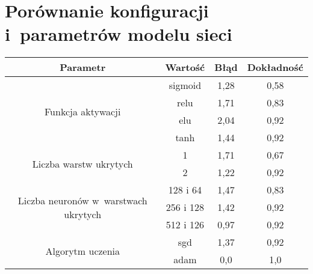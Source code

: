 \chapter{Porównanie konfiguracji i~parametrów modelu sieci}
\label{ch:nn_comparison_table}

\begin{table}[h]
\centering
\begin{tabular}{c|c|c|c}
\toprule
Parametr                                              & Wartość   & Błąd & Dokładność \\
\midrule
\multirow{4}{*}{Funkcja aktywacji}                    & sigmoid   & 1,28 & 0,58       \\
                                                      & relu      & 1,71 & 0,83       \\
                                                      & elu       & 2,04 & 0,92       \\
                                                      & tanh      & 1,44 & 0,92       \\
\midrule
\multirow{2}{*}{Liczba warstw ukrytych}               & 1         & 1,71 & 0,67       \\
                                                      & 2         & 1,22 & 0,92       \\
\midrule                                                     
\multirow{3}{*}{\parbox{5cm}
{\centering Liczba neuronów w~warstwach ukrytych}}     & 128 i 64  & 1,47 & 0,83       \\
                                                      & 256 i 128 & 1,42 & 0,92       \\
                                                      & 512 i 126 & 0,97 & 0,92       \\
\midrule
\multirow{2}{*}{Algorytm uczenia}                     & sgd       & 1,37 & 0,92       \\
                                                      & adam      & 0,0  & 1,0        \\
\bottomrule
\end{tabular}
\end{table}